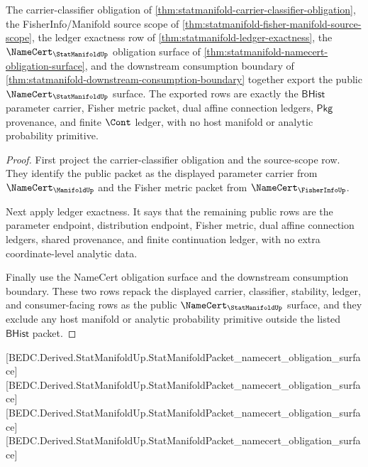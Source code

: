 \begin{theorem}
\label{thm:statmanifold-public-certificate-export}
The carrier-classifier obligation of
\autoref{thm:statmanifold-carrier-classifier-obligation}, the
FisherInfo/Manifold source scope of
\autoref{thm:statmanifold-fisher-manifold-source-scope}, the ledger
exactness row of \autoref{thm:statmanifold-ledger-exactness}, the
$\NameCert_{\StatManifoldUp}$ obligation surface of
\autoref{thm:statmanifold-namecert-obligation-surface}, and the downstream
consumption boundary of
\autoref{thm:statmanifold-downstream-consumption-boundary} together export
the public $\NameCert_{\StatManifoldUp}$ surface. The exported rows are
exactly the $\mathsf{BHist}$ parameter carrier, Fisher metric packet, dual
affine connection ledgers, $\mathsf{Pkg}$ provenance, and finite $\Cont$
ledger, with no host manifold or analytic probability primitive.
\end{theorem}
\begin{proof}
First project the carrier-classifier obligation and the source-scope row. They
identify the public packet as the displayed parameter carrier from
$\NameCert_{\ManifoldUp}$ and the Fisher metric packet from
$\NameCert_{\FisherInfoUp}$.

Next apply ledger exactness. It says that the remaining public rows are the
parameter endpoint, distribution endpoint, Fisher metric, dual affine
connection ledgers, shared provenance, and finite continuation ledger, with no
extra coordinate-level analytic data.

Finally use the NameCert obligation surface and the downstream consumption
boundary. These two rows repack the displayed carrier, classifier, stability,
ledger, and consumer-facing rows as the public $\NameCert_{\StatManifoldUp}$
surface, and they exclude any host manifold or analytic probability primitive
outside the listed $\mathsf{BHist}$ packet.
\end{proof}

[BEDC.Derived.StatManifoldUp.StatManifoldPacket\_namecert\_obligation\_surface]
[BEDC.Derived.StatManifoldUp.StatManifoldPacket\_namecert\_obligation\_surface]
[BEDC.Derived.StatManifoldUp.StatManifoldPacket\_namecert\_obligation\_surface]
[BEDC.Derived.StatManifoldUp.StatManifoldPacket\_namecert\_obligation\_surface]

